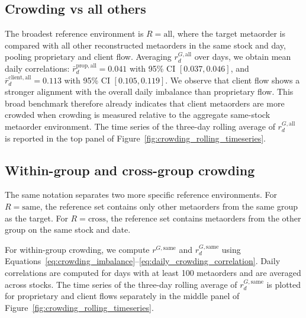 \documentclass[11pt]{article}
\begin{document}
\subsection{Crowding vs all others}
\label{subsec:all_vs_all_crowding}

The broadest reference environment is \(R=\mathrm{all}\), where the target
metaorder is compared with all other reconstructed metaorders in the same stock
and day, pooling proprietary and client flow. Averaging \(r_d^{G,\mathrm{all}}\)
over days, we obtain mean daily correlations:
\(\bar r_d^{\mathrm{prop},\mathrm{all}} = 0.041\) with 95\% CI
\([0.037, 0.046]\), and \(\bar r_d^{\mathrm{client},\mathrm{all}} = 0.113\)
with 95\% CI \([0.105, 0.119]\).
We observe that client flow shows a stronger alignment with the overall daily
imbalance than proprietary flow. This broad benchmark therefore already indicates
that client metaorders are more crowded when crowding is measured relative to the
aggregate same-stock metaorder environment. The time series of the three-day
rolling average of \(r_d^{G,\mathrm{all}}\) is reported in the top panel of
Figure~\ref{fig:crowding_rolling_timeseries}.

\subsection{Within-group and cross-group crowding}
\label{subsec:imbalance}

The same notation separates two more specific reference environments. For
\(R=\mathrm{same}\), the reference set contains only other metaorders from the
same group as the target. For \(R=\mathrm{cross}\), the reference set contains
metaorders from the other group on the same stock and date.

For within-group crowding, we compute \(r^{G,\mathrm{same}}\) and
\(r_d^{G,\mathrm{same}}\) using Equations~\eqref{eq:crowding_imbalance}--\eqref{eq:daily_crowding_correlation}.
Daily correlations are computed for days with at least 100 metaorders and are
averaged across stocks. The time series of the three-day rolling average of
\(r_d^{G,\mathrm{same}}\) is plotted for proprietary and client flows separately
in the middle panel of Figure~\ref{fig:crowding_rolling_timeseries}.
\end{document}
